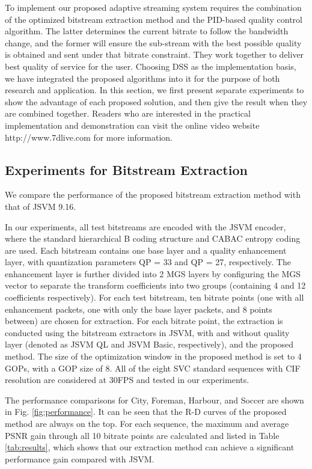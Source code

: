 \documentclass[journal]{IEEEtran}
\begin{document}
To implement our proposed adaptive streaming system requires the combination of the optimized bitstream extraction method and the PID-based quality control algorithm. The latter determines the current bitrate to follow the bandwidth change, and the former will ensure the sub-stream with the best possible quality is obtained and sent under that bitrate constraint. They work together to deliver best quality of service for the user. Choosing DSS as the implementation basis, we have integrated the proposed algorithms into it for the purpose of both research and application. In this section, we first present separate experiments to show the advantage of each proposed solution, and then give the result when they are combined together. Readers who are interested in the practical implementation and demonstration can visit the online video website http://www.7dlive.com for more information.

\subsection{Experiments for Bitstream Extraction}

We compare the performance of the proposed bitstream extraction method with that of JSVM 9.16.

In our experiments, all test bitstreams are encoded with the JSVM encoder, where the standard hierarchical B coding structure and CABAC entropy coding are used. Each bitstream contains one base layer and a quality enhancement layer, with quantization parameters QP = 33 and QP = 27, respectively. The enhancement layer is further divided into 2 MGS layers by configuring the MGS vector to separate the transform coefficients into two groups (containing 4 and 12 coefficients respectively). For each test bitstream, ten bitrate points (one with all enhancement packets, one with only the base layer packets, and 8 points between) are chosen for extraction. For each bitrate point, the extraction is conducted using the bitstream extractors in JSVM, with and without quality layer (denoted as JSVM QL and JSVM Basic, respectively), and the proposed method. The size of the optimization window in the proposed method is set to 4 GOPs, with a GOP size of 8. All of the eight SVC standard sequences with CIF resolution are considered at 30FPS and tested in our experiments.

The performance comparisons for City, Foreman, Harbour, and Soccer are shown in Fig. \ref{fig:performance}. It can be seen that the R-D curves of the proposed method are always on the top. For each sequence, the maximum and average PSNR gain through all 10 bitrate points are calculated and listed in Table \ref{tab:results}, which shows that our extraction method can achieve a significant performance gain compared with JSVM.
\end{document}
